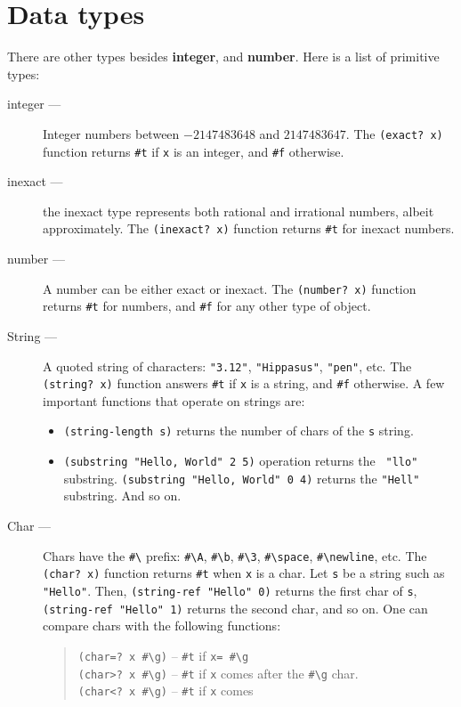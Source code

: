 \documentclass[a4paper,12pt]{book}
\begin{document}
\section{Data types}
There are other types
besides {\bf integer}, and {\bf number}. 
Here is a  list of primitive types:
\begin{description}
\item[integer ---] Integer numbers between $-2147483648$ and $2147483647$.
The \verb|(exact? x)| function returns \verb|#t| if \verb|x|
is an integer, and \verb|#f| otherwise.
\item[inexact ---] the inexact type represents both
rational and irrational numbers, albeit approximately.
The \verb|(inexact? x)| function returns \verb|#t| for
inexact numbers.
\item[number ---] A number can be either exact or inexact.
The \verb|(number? x)| function returns \verb|#t| for numbers,
and \verb|#f| for any other type of object.
\item[String ---] A quoted string 
of characters: \verb|"3.12"|, \verb|"Hippasus"|, \verb|"pen"|, etc.
The \verb|(string? x)| function answers \verb|#t| 
if \verb|x| is a string, and \verb|#f| otherwise.
A few important functions that operate on strings are:
\begin{itemize}
\item \verb|(string-length s)| returns the number
of chars of the \verb|s| string.
\item\verb|(substring "Hello, World" 2 5)| operation
returns the \verb| "llo"| substring.
\verb|(substring "Hello, World" 0 4)| returns the
\verb|"Hell"| substring. And so on.
\end{itemize}
\item[Char ---] Chars have the \verb|#\| prefix: 
\verb|#\A|,
\verb|#\b|, \verb|#\3|, \verb|#\space|,
\verb|#\newline|, etc.
The \verb|(char? x)| function returns \verb|#t|
when \verb|x| is a char. Let \verb|s| be
a string such as \verb|"Hello"|. Then,
\verb|(string-ref "Hello" 0)|
returns the first char of \verb|s|,
\verb|(string-ref "Hello" 1)| returns
the second char, and so on. One can compare
chars with the following functions:
\begin{quote}
\verb|(char=? x #\g)| -- \verb|#t| if \verb|x= #\g|\\
\verb|(char>? x #\g)| -- \verb|#t| if \verb|x| comes
after the \verb|#\g| char.\\
\verb|(char<? x #\g)| -- \verb|#t| if \verb|x| comes

\end{quote}
\end{description}
\end{document}
